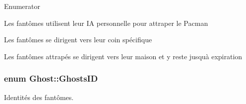 \begin{Desc}
\item[Enumerator]\par
\begin{description}
\item[{\em 
\hypertarget{class_ghost_a95bc4313fdf87d827c64fe9607fcc205a4e0f748a4d226742a8d524f8386fc6db}{}Chase\label{class_ghost_a95bc4313fdf87d827c64fe9607fcc205a4e0f748a4d226742a8d524f8386fc6db}
}]Les fantômes utilisent leur I\+A personnelle pour attraper le Pacman \item[{\em 
\hypertarget{class_ghost_a95bc4313fdf87d827c64fe9607fcc205a49e7cffc44104e0f3f65579a25804b63}{}Scatter\label{class_ghost_a95bc4313fdf87d827c64fe9607fcc205a49e7cffc44104e0f3f65579a25804b63}
}]Les fantômes se dirigent vers leur coin spécifique \item[{\em 
\hypertarget{class_ghost_a95bc4313fdf87d827c64fe9607fcc205ae7975f0b636e971a50a0a4285353ac0e}{}Caught\label{class_ghost_a95bc4313fdf87d827c64fe9607fcc205ae7975f0b636e971a50a0a4285353ac0e}
}]Les fantômes attrapés se dirigent vers leur maison et y reste jusqu\textquotesingle{}à expiration \end{description}
\end{Desc}
\hypertarget{class_ghost_adc8bee2d77e1ca0e4999cace773c71dd}{}
\subsubsection[{Ghosts\+I\+D}]{\setlength{\rightskip}{0pt plus 5cm}enum {\bf Ghost\+::\+Ghosts\+I\+D}}\label{class_ghost_adc8bee2d77e1ca0e4999cace773c71dd}


Identités des fantômes. 

